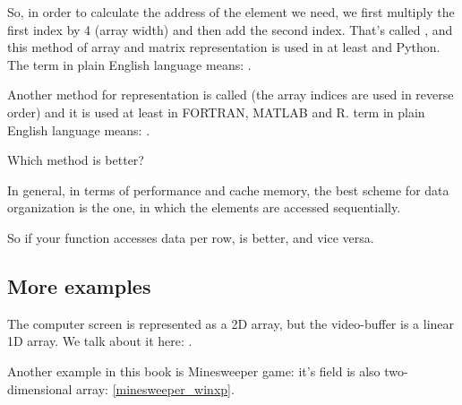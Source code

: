 
So, in order to calculate the address of the element we need, we first multiply the first index by
4 (array width) and then add the second index.
That's called , 
and this method of array and matrix representation is used in at least \CCpp and Python. 
The term  
in plain English language means: .

Another method for representation is called  (the array indices are used in reverse order) 
and it is used at least in FORTRAN, MATLAB and R. 
 term in plain English language means: .

Which method is better?

In general, in terms of performance and cache memory, 
the best scheme for data organization is the one,
in which the elements are accessed sequentially.

So if your function accesses data per row,  is better, and vice versa.





\subsection{More examples}

The computer screen is represented as a 2D array, but the video-buffer is a linear 1D array. 
We talk about it here: .

Another example in this book is Minesweeper game: it's field is also two-dimensional array: \ref{minesweeper_winxp}.

